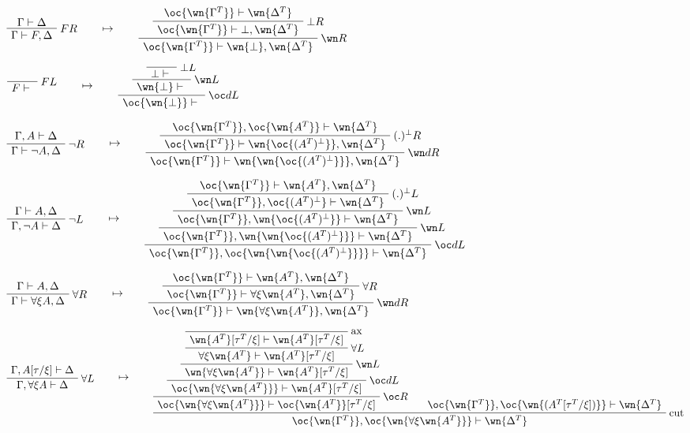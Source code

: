 \(\AxRule{\Gamma\vdash \Delta}
\LabelRule{F R}
\UnaRule{\Gamma\vdash F,\Delta}
\DisplayProof
\qquad\mapsto\qquad
\AxRule{\oc{\wn{\Gamma^T}}\vdash \wn{\Delta^T}}
\LabelRule{\bot R}
\UnaRule{\oc{\wn{\Gamma^T}}\vdash \bot,\wn{\Delta^T}}
\LabelRule{\wn R}
\UnaRule{\oc{\wn{\Gamma^T}}\vdash \wn{\bot},\wn{\Delta^T}}
\DisplayProof\)

\(\LabelRule{F L}
\NulRule{F\vdash {}}
\DisplayProof
\qquad\mapsto\qquad
\LabelRule{\bot L}
\NulRule{\bot\vdash {}}
\LabelRule{\wn L}
\UnaRule{\wn{\bot}\vdash {}}
\LabelRule{\oc d L}
\UnaRule{\oc{\wn{\bot}}\vdash {}}
\DisplayProof\)

\(\AxRule{\Gamma,A\vdash \Delta}
\LabelRule{\neg R}
\UnaRule{\Gamma\vdash \neg A,\Delta}
\DisplayProof
\qquad\mapsto\qquad
\AxRule{\oc{\wn{\Gamma^T}},\oc{\wn{A^T}}\vdash \wn{\Delta^T}}
\LabelRule{(.)\orth R}
\UnaRule{\oc{\wn{\Gamma^T}}\vdash \wn{\oc{(A^T)\orth}},\wn{\Delta^T}}
\LabelRule{\wn d R}
\UnaRule{\oc{\wn{\Gamma^T}}\vdash \wn{\wn{\oc{(A^T)\orth}}},\wn{\Delta^T}}
\DisplayProof\)

\(\AxRule{\Gamma\vdash A,\Delta}
\LabelRule{\neg L}
\UnaRule{\Gamma,\neg A\vdash \Delta}
\DisplayProof
\qquad\mapsto\qquad
\AxRule{\oc{\wn{\Gamma^T}}\vdash \wn{A^T},\wn{\Delta^T}}
\LabelRule{(.)\orth L}
\UnaRule{\oc{\wn{\Gamma^T}},\oc{(A^T)\orth}\vdash \wn{\Delta^T}}
\LabelRule{\wn L}
\UnaRule{\oc{\wn{\Gamma^T}},\wn{\oc{(A^T)\orth}}\vdash \wn{\Delta^T}}
\LabelRule{\wn L}
\UnaRule{\oc{\wn{\Gamma^T}},\wn{\wn{\oc{(A^T)\orth}}}\vdash \wn{\Delta^T}}
\LabelRule{\oc d L}
\UnaRule{\oc{\wn{\Gamma^T}},\oc{\wn{\wn{\oc{(A^T)\orth}}}}\vdash \wn{\Delta^T}}
\DisplayProof\)

\(\AxRule{\Gamma\vdash A,\Delta}
\LabelRule{\forall R}
\UnaRule{\Gamma\vdash \forall\xi A,\Delta}
\DisplayProof
\qquad\mapsto\qquad
\AxRule{\oc{\wn{\Gamma^T}}\vdash \wn{A^T},\wn{\Delta^T}}
\LabelRule{\forall R}
\UnaRule{\oc{\wn{\Gamma^T}}\vdash \forall\xi \wn{A^T},\wn{\Delta^T}}
\LabelRule{\wn d R}
\UnaRule{\oc{\wn{\Gamma^T}}\vdash \wn{\forall\xi \wn{A^T}},\wn{\Delta^T}}
\DisplayProof\)

\(\AxRule{\Gamma,A[\tau/\xi]\vdash \Delta}
\LabelRule{\forall L}
\UnaRule{\Gamma,\forall\xi A\vdash \Delta}
\DisplayProof
\qquad\mapsto\qquad
\LabelRule{\rulename{ax}}
\NulRule{\wn{A^T}[\tau^T/\xi]\vdash \wn{A^T}[\tau^T/\xi]}
\LabelRule{\forall L}
\UnaRule{\forall\xi \wn{A^T}\vdash \wn{A^T}[\tau^T/\xi]}
\LabelRule{\wn L}
\UnaRule{\wn{\forall\xi \wn{A^T}}\vdash \wn{A^T}[\tau^T/\xi]}
\LabelRule{\oc d L}
\UnaRule{\oc{\wn{\forall\xi \wn{A^T}}}\vdash \wn{A^T}[\tau^T/\xi]}
\LabelRule{\oc R}
\UnaRule{\oc{\wn{\forall\xi \wn{A^T}}}\vdash \oc{\wn{A^T}}[\tau^T/\xi]}
\AxRule{\oc{\wn{\Gamma^T}},\oc{\wn{(A^T[\tau^T/\xi])}}\vdash \wn{\Delta^T}}
\LabelRule{\rulename{cut}}
\BinRule{\oc{\wn{\Gamma^T}},\oc{\wn{\forall\xi \wn{A^T}}}\vdash \wn{\Delta^T}}
\DisplayProof\)

